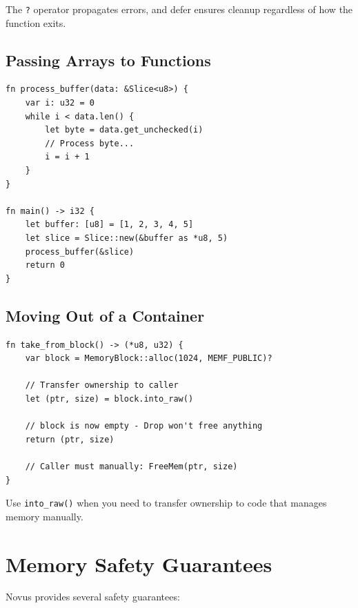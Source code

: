 The \texttt{?} operator propagates errors, and defer ensures cleanup regardless of how the function exits.

\subsection{Passing Arrays to Functions}

\begin{lstlisting}
fn process_buffer(data: &Slice<u8>) {
    var i: u32 = 0
    while i < data.len() {
        let byte = data.get_unchecked(i)
        // Process byte...
        i = i + 1
    }
}

fn main() -> i32 {
    let buffer: [u8] = [1, 2, 3, 4, 5]
    let slice = Slice::new(&buffer as *u8, 5)
    process_buffer(&slice)
    return 0
}
\end{lstlisting}

\subsection{Moving Out of a Container}

\begin{lstlisting}
fn take_from_block() -> (*u8, u32) {
    var block = MemoryBlock::alloc(1024, MEMF_PUBLIC)?

    // Transfer ownership to caller
    let (ptr, size) = block.into_raw()

    // block is now empty - Drop won't free anything
    return (ptr, size)

    // Caller must manually: FreeMem(ptr, size)
}
\end{lstlisting}

Use \texttt{into\_raw()} when you need to transfer ownership to code that manages memory manually.

\section{Memory Safety Guarantees}

Novus provides several safety guarantees:

